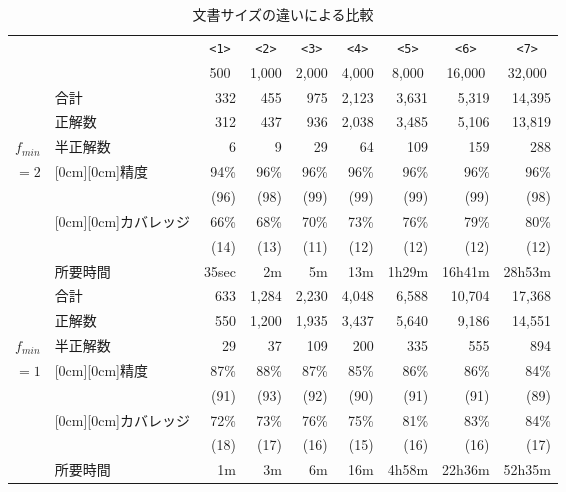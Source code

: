 \begin{table}[t]
\caption{文書サイズの違いによる比較}
\label{文書サイズ}
\begin{center}
\begin{tabular}{l|l||r|r|r|r|r|r|r}
\hline
\multicolumn{2}{c||}{} 
& \multicolumn{1}{c|}{\verb|<1>|}
& \multicolumn{1}{c|}{\verb|<2>|}
& \multicolumn{1}{c|}{\verb|<3>|}
& \multicolumn{1}{c|}{\verb|<4>|}
& \multicolumn{1}{c|}{\verb|<5>|}
& \multicolumn{1}{c|}{\verb|<6>|}
& \multicolumn{1}{c}{\verb|<7>|}\\
\multicolumn{2}{c||}{} 
& \multicolumn{1}{c|}{500}
& \multicolumn{1}{c|}{1,000}
& \multicolumn{1}{c|}{2,000}
& \multicolumn{1}{c|}{4,000}
& \multicolumn{1}{c|}{8,000}
& \multicolumn{1}{c|}{16,000}
& \multicolumn{1}{c}{32,000}\\
\hline

& 合計    & 332  & 455   & 975 & 2,123 & 3,631   & 5,319 & 14,395  \\
& 正解数  & 312  & 437   & 936 & 2,038 & 3,485   & 5,106 & 13,819  \\
$f_{min}$ 
& 半正解数&   6  &   9   &  29 &    64 &   109   &   159 &   288   \\
\cline{2-9}
$=2$      
&\raisebox{-1.5ex}[0cm][0cm]{精度}    
          & 94\%& 96\%& 96\%& 96\%&96\%& 96\%& 96\% \\
&         & (96)& (98)& (99)& (99)&(99)& (99)& (98) \\\cline{2-9}
&\raisebox{-1.5ex}[0cm][0cm]{カバレッジ}
          & 66\%& 68\%& 70\%& 73\%&76\% & 79\% & 80\% \\
&         & (14)& (13)& (11)& (12)&(12) &(12)  &(12)  \\ \cline{2-9}
&所要時間 & 35sec &2m &5m   &13m  &1h29m&16h41m&28h53m\\
\hline
& 合計    & 633 &1,284&2,230&4,048&6,588&10,704&17,368\\
& 正解数  & 550 &1,200&1,935&3,437&5,640&9,186 &14,551\\ 
$f_{min}$ 
& 半正解数&  29 &   37&  109&  200&  335&   555&  894 \\ \cline{2-9}
$=1$      
&\raisebox{-1.5ex}[0cm][0cm]{精度} 
          & 87\%& 88\%& 87\%& 85\%& 86\%&  86\%& 84\%\\
&         & (91)& (93)& (92)& (90)& (91)&  (91)& (89)\\ \cline{2-9}
&\raisebox{-1.5ex}[0cm][0cm]{カバレッジ}
          & 72\%& 73\%& 76\%& 75\%& 81\%& 83\%& 84\% \\
&         & (18)& (17)& (16)& (15)& (16)& (16)& (17)\\ \cline{2-9}
&所要時間 &  1m &  3m &  6m &  16m&4h58m&22h36m&52h35m\\
\hline
\end{tabular}
\end{center}
\end{table}

